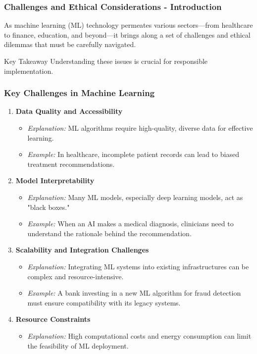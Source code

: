\documentclass[aspectratio=169]{beamer}
\begin{document}
\begin{frame}[fragile]
    \frametitle{Challenges and Ethical Considerations - Introduction}
    As machine learning (ML) technology permeates various sectors—from healthcare to finance, education, and beyond—it brings along a set of challenges and ethical dilemmas that must be carefully navigated. 
    \begin{block}{Key Takeaway}
        Understanding these issues is crucial for responsible implementation.
    \end{block}
\end{frame}

\begin{frame}[fragile]
    \frametitle{Key Challenges in Machine Learning}
    \begin{enumerate}
        \item \textbf{Data Quality and Accessibility}
        \begin{itemize}
            \item \textit{Explanation:} ML algorithms require high-quality, diverse data for effective learning.
            \item \textit{Example:} In healthcare, incomplete patient records can lead to biased treatment recommendations.
        \end{itemize}

        \item \textbf{Model Interpretability}
        \begin{itemize}
            \item \textit{Explanation:} Many ML models, especially deep learning models, act as "black boxes."
            \item \textit{Example:} When an AI makes a medical diagnosis, clinicians need to understand the rationale behind the recommendation.
        \end{itemize}

        \item \textbf{Scalability and Integration Challenges}
        \begin{itemize}
            \item \textit{Explanation:} Integrating ML systems into existing infrastructures can be complex and resource-intensive.
            \item \textit{Example:} A bank investing in a new ML algorithm for fraud detection must ensure compatibility with its legacy systems.
        \end{itemize}
        
        \item \textbf{Resource Constraints}
        \begin{itemize}
            \item \textit{Explanation:} High computational costs and energy consumption can limit the feasibility of ML deployment.
        \end{itemize}
    \end{enumerate}
\end{frame}
\end{document}
